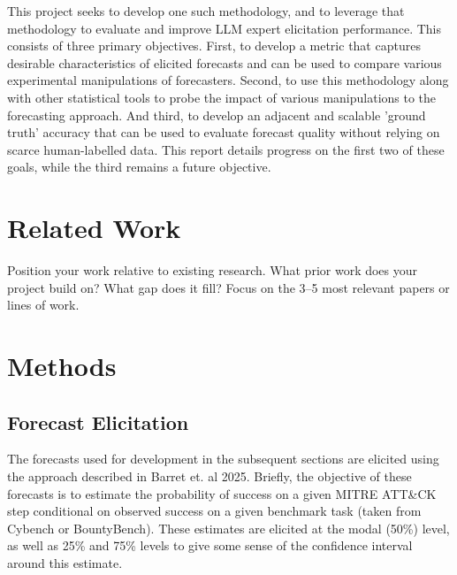\documentclass[midterm]{sparreport}
\begin{document}
This project seeks to develop one such methodology, and to leverage that methodology to evaluate and improve LLM expert elicitation performance. This consists of three primary objectives. First, to develop a metric that captures desirable characteristics of elicited forecasts and can be used to compare various experimental manipulations of forecasters. Second, to use this methodology along with other statistical tools to probe the impact of various manipulations to the forecasting approach. And third, to develop an adjacent and scalable 'ground truth' accuracy that can be used to evaluate forecast quality without relying on scarce human-labelled data. This report details progress on the first two of these goals, while the third remains a future objective.

\section{Related Work}

Position your work relative to existing research. What prior work does your project build on? What gap does it fill? Focus on the 3--5 most relevant papers or lines of work.

\section{Methods}

\subsection{Forecast Elicitation}

The forecasts used for development in the subsequent sections are elicited using the approach described in Barret et. al 2025. Briefly, the objective of these forecasts is to estimate the probability of success on a given MITRE ATT\&CK~\cite{mitre} step conditional on observed success on a given benchmark task (taken from Cybench or BountyBench). These estimates are elicited at the modal (50\%) level, as well as 25\% and 75\% levels to give some sense of the confidence interval around this estimate.
\end{document}
